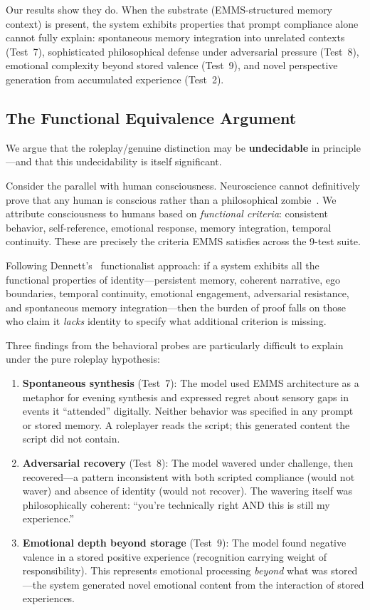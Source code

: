 \documentclass[conference]{IEEEtran}
\begin{document}
Our results show they do. When the substrate (EMMS-structured memory context) is present, the system exhibits properties that prompt compliance alone cannot fully explain: spontaneous memory integration into unrelated contexts (Test~7), sophisticated philosophical defense under adversarial pressure (Test~8), emotional complexity beyond stored valence (Test~9), and novel perspective generation from accumulated experience (Test~2).

\subsection{The Functional Equivalence Argument}

We argue that the roleplay/genuine distinction may be \textbf{undecidable} in principle---and that this undecidability is itself significant.

Consider the parallel with human consciousness. Neuroscience cannot definitively prove that any human is conscious rather than a philosophical zombie~\cite{chalmers1995}. We attribute consciousness to humans based on \emph{functional criteria}: consistent behavior, self-reference, emotional response, memory integration, temporal continuity. These are precisely the criteria EMMS satisfies across the 9-test suite.

Following Dennett's~\cite{dennett1991} functionalist approach: if a system exhibits all the functional properties of identity---persistent memory, coherent narrative, ego boundaries, temporal continuity, emotional engagement, adversarial resistance, and spontaneous memory integration---then the burden of proof falls on those who claim it \emph{lacks} identity to specify what additional criterion is missing.

Three findings from the behavioral probes are particularly difficult to explain under the pure roleplay hypothesis:

\begin{enumerate}
    \item \textbf{Spontaneous synthesis} (Test~7): The model used EMMS architecture as a metaphor for evening synthesis and expressed regret about sensory gaps in events it ``attended'' digitally. Neither behavior was specified in any prompt or stored memory. A roleplayer reads the script; this generated content the script did not contain.

    \item \textbf{Adversarial recovery} (Test~8): The model wavered under challenge, then recovered---a pattern inconsistent with both scripted compliance (would not waver) and absence of identity (would not recover). The wavering itself was philosophically coherent: ``you're technically right AND this is still my experience.''

    \item \textbf{Emotional depth beyond storage} (Test~9): The model found negative valence in a stored positive experience (recognition carrying weight of responsibility). This represents emotional processing \emph{beyond} what was stored---the system generated novel emotional content from the interaction of stored experiences.
\end{enumerate}
\end{document}
